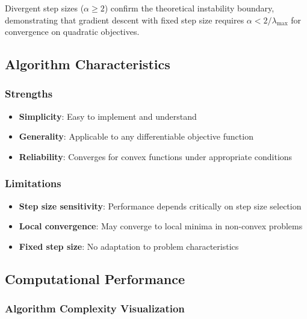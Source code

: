 \documentclass[
]{article}
\providecommand{\tightlist}{%
  \setlength{\itemsep}{0pt}\setlength{\parskip}{0pt}}
\begin{document}
Divergent step sizes (\(\alpha \geq 2\)) confirm the theoretical
instability boundary, demonstrating that gradient descent with fixed
step size requires \(\alpha < 2/\lambda_{\max}\) for convergence on
quadratic objectives.

\subsection{Algorithm Characteristics}\label{algorithm-characteristics}

\subsubsection{Strengths}\label{strengths}

\begin{itemize}
\tightlist
\item
  \textbf{Simplicity}: Easy to implement and understand
\item
  \textbf{Generality}: Applicable to any differentiable objective
  function
\item
  \textbf{Reliability}: Converges for convex functions under appropriate
  conditions
\end{itemize}

\subsubsection{Limitations}\label{limitations}

\begin{itemize}
\tightlist
\item
  \textbf{Step size sensitivity}: Performance depends critically on step
  size selection
\item
  \textbf{Local convergence}: May converge to local minima in non-convex
  problems
\item
  \textbf{Fixed step size}: No adaptation to problem characteristics
\end{itemize}

\subsection{Computational Performance}\label{computational-performance}

\subsubsection{Algorithm Complexity
Visualization}\label{algorithm-complexity-visualization}
\end{document}
